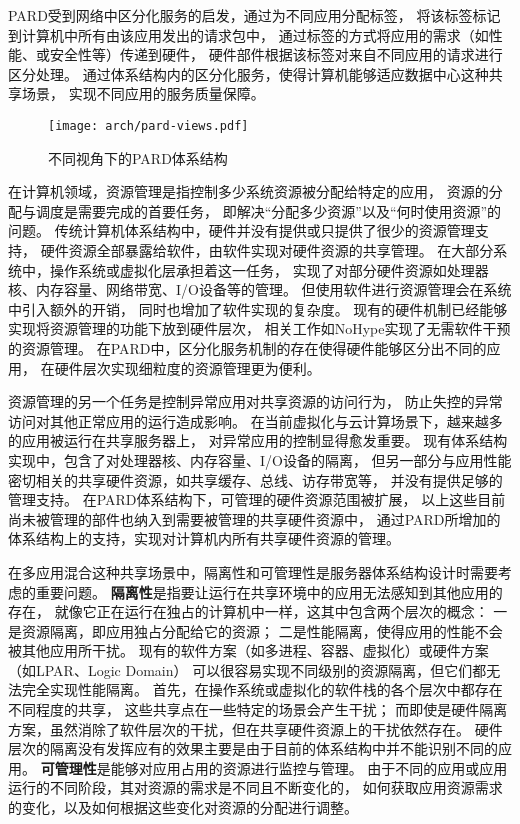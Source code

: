 PARD受到网络中区分化服务的启发，通过为不同应用分配标签，
将该标签标记到计算机中所有由该应用发出的请求包中，
通过标签的方式将应用的需求（如性能、或安全性等）传递到硬件，
硬件部件根据该标签对来自不同应用的请求进行区分处理。
通过体系结构内的区分化服务，使得计算机能够适应数据中心这种共享场景，
实现不同应用的服务质量保障。

\begin{figure}[t]
  \centering
  \texttt{[image: arch/pard-views.pdf]}
  \caption{不同视角下的PARD体系结构}
  \label{fig:pard-views}
\end{figure}

在计算机领域，资源管理是指控制多少系统资源被分配给特定的应用，
资源的分配与调度是需要完成的首要任务，
即解决``分配多少资源''以及``何时使用资源''的问题。
传统计算机体系结构中，硬件并没有提供或只提供了很少的资源管理支持，
硬件资源全部暴露给软件，由软件实现对硬件资源的共享管理。
在大部分系统中，操作系统或虚拟化层承担着这一任务，
实现了对部分硬件资源如处理器核、内存容量、网络带宽、I/O设备等的管理。
但使用软件进行资源管理会在系统中引入额外的开销\cite{xen-overhead2005}，
同时也增加了软件实现的复杂度。
现有的硬件机制已经能够实现将资源管理的功能下放到硬件层次，
相关工作如NoHype\cite{keller_nohype:_2010}实现了无需软件干预的资源管理。
在PARD中，区分化服务机制的存在使得硬件能够区分出不同的应用，
在硬件层次实现细粒度的资源管理更为便利。



资源管理的另一个任务是控制异常应用对共享资源的访问行为，
防止失控的异常访问对其他正常应用的运行造成影响。
在当前虚拟化与云计算场景下，越来越多的应用被运行在共享服务器上，
对异常应用的控制显得愈发重要。
现有体系结构实现中，包含了对处理器核、内存容量、I/O设备的隔离，
但另一部分与应用性能密切相关的共享硬件资源，如共享缓存、总线、访存带宽等，
并没有提供足够的管理支持。
在PARD体系结构下，可管理的硬件资源范围被扩展，
以上这些目前尚未被管理的部件也纳入到需要被管理的共享硬件资源中，
通过PARD所增加的体系结构上的支持，实现对计算机内所有共享硬件资源的管理。

在多应用混合这种共享场景中，隔离性和可管理性是服务器体系结构设计时需要考虑的重要问题。
\textbf{隔离性}是指要让运行在共享环境中的应用无法感知到其他应用的存在，
就像它正在运行在独占的计算机中一样，这其中包含两个层次的概念：
一是资源隔离，即应用独占分配给它的资源；
二是性能隔离，使得应用的性能不会被其他应用所干扰。
现有的软件方案（如多进程、容器、虚拟化）或硬件方案（如LPAR、Logic Domain）
可以很容易实现不同级别的资源隔离，但它们都无法完全实现性能隔离。
首先，在操作系统或虚拟化的软件栈的各个层次中都存在不同程度的共享，
这些共享点在一些特定的场景会产生干扰；
而即使是硬件隔离方案，虽然消除了软件层次的干扰，但在共享硬件资源上的干扰依然存在。
硬件层次的隔离没有发挥应有的效果主要是由于目前的体系结构中并不能识别不同的应用。
\textbf{可管理性}是能够对应用占用的资源进行监控与管理。
由于不同的应用或应用运行的不同阶段，其对资源的需求是不同且不断变化的，
如何获取应用资源需求的变化，以及如何根据这些变化对资源的分配进行调整。

